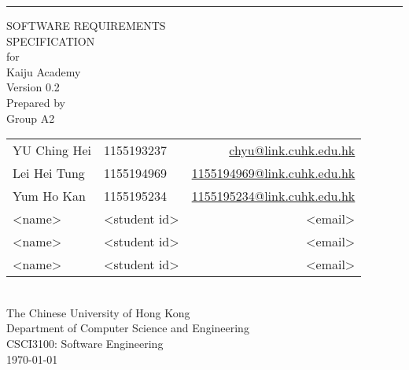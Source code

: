 \documentclass[a4paper, 11pt]{scrreprt}
\date{}
\def\myversion{0.2}
\def\projectname{Kaiju Academy}
\begin{document}

\begin{titlepage}
    \begin{flushright}
        \rule{\textwidth}{5pt}\vskip1cm
        \begin{bfseries}
            \Huge{SOFTWARE REQUIREMENTS\\ SPECIFICATION}\\
            \vspace{1.6cm}
            for\\
            \vspace{1.6cm}
            \projectname\\  %
            \vspace{1.6cm}
            \LARGE{Version \myversion}\\
            \vspace{1.6cm}
            Prepared by\\
            Group A2\\
            \vspace{0.5cm}
            \begin{tabularx}{\textwidth}{X l r}
            YU Ching Hei & 1155193237 & \href{mailto:chyu@link.cuhk.edu.hk}{chyu@link.cuhk.edu.hk}\\
            Lei Hei Tung & 1155194969 & \href{mailto:1155194969@link.cuhk.edu.hk}{1155194969@link.cuhk.edu.hk}\\
            Yum Ho Kan & 1155195234 & \href{mailto:1155195234@link.cuhk.edu.hk}{1155195234@link.cuhk.edu.hk}\\
            <name> & <student id> & <email>\\
            <name> & <student id> & <email>\\
            <name> & <student id> & <email>\\
            \end{tabularx}\\
            \vspace{1.6cm}
            The Chinese University of Hong Kong\\
            Department of Computer Science and Engineering\\
            CSCI3100: Software Engineering\\
            \vspace{1.6cm}
            \today\\
        \end{bfseries}
    \end{flushright}
\end{titlepage}
\end{document}
